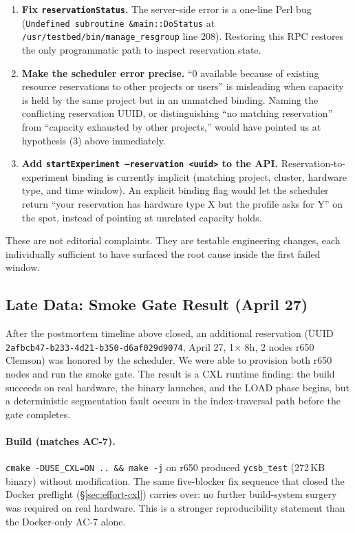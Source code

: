 \documentclass[11pt,a4paper]{article}
\begin{document}
\begin{enumerate}[nosep]
    \item \textbf{Fix \texttt{reservationStatus}.} The server-side error is a one-line Perl bug (\texttt{Undefined subroutine \&main::DoStatus} at \texttt{/usr/testbed/bin/manage\_resgroup} line 208). Restoring this RPC restores the only programmatic path to inspect reservation state.
    \item \textbf{Make the scheduler error precise.} ``0 available because of existing resource reservations to other projects or users'' is misleading when capacity is held by the same project but in an unmatched binding. Naming the conflicting reservation UUID, or distinguishing ``no matching reservation'' from ``capacity exhausted by other projects,'' would have pointed us at hypothesis (3) above immediately.
    \item \textbf{Add \texttt{startExperiment --reservation <uuid>} to the API.} Reservation-to-experiment binding is currently implicit (matching project, cluster, hardware type, and time window). An explicit binding flag would let the scheduler return ``your reservation has hardware type X but the profile asks for Y'' on the spot, instead of pointing at unrelated capacity holds.
\end{enumerate}

These are not editorial complaints. They are testable engineering changes, each individually sufficient to have surfaced the root cause inside the first failed window.

\subsection{Late Data: Smoke Gate Result (April 27)}
\label{sec:late-data}

After the postmortem timeline above closed, an additional reservation (UUID \texttt{2afbcb47-b233-4d21-b350-d6af029d9074}, April 27, 1$\times$ 8h, 2 nodes r650 Clemson) was honored by the scheduler. We were able to provision both r650 nodes and run the smoke gate. The result is a CXL runtime finding: the build succeeds on real hardware, the binary launches, and the LOAD phase begins, but a deterministic segmentation fault occurs in the index-traversal path before the gate completes.

\paragraph{Build (matches AC-7).} \texttt{cmake -DUSE\_CXL=ON .. \&\& make -j} on r650 produced \texttt{ycsb\_test} (272\,KB binary) without modification. The same five-blocker fix sequence that closed the Docker preflight (\S\ref{sec:effort-cxl}) carries over: no further build-system surgery was required on real hardware. This is a stronger reproducibility statement than the Docker-only AC-7 alone.
\end{document}
